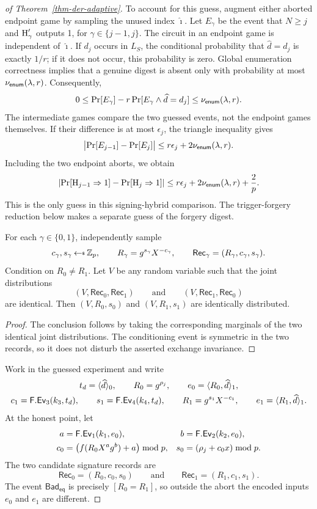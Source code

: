\begin{proof}[of Theorem~\ref{thm-der-adaptive}]
To account for this guess, augment either aborted endpoint game by sampling the unused index $\widehat\imath$. Let $E_\gamma$ be the event that $N\ge j$ and $\textnormal{H}'_\gamma$ outputs 1, for $\gamma\in\{j-1,j\}$. The circuit in an endpoint game is independent of $\widehat\imath$. If $d_j$ occurs in $L_S$, the conditional probability that $\widehat d=d_j$ is exactly $1/r$; if it does not occur, this probability is zero. Global enumeration correctness implies that a genuine digest is absent only with probability at most $\nu_{\mathsf{enum}}(\lambda,r)$. Consequently,
$$
0\le
\Pr[E_\gamma]-r\Pr[E_\gamma\land \widehat d=d_j]
\le \nu_{\mathsf{enum}}(\lambda,r).
$$
The intermediate games compare the two guessed events, not the endpoint games themselves. If their difference is at most $\epsilon_j$, the triangle inequality gives
$$
\bigl|\Pr[E_{j-1}]-\Pr[E_j]\bigr|
\le r\epsilon_j+2\nu_{\mathsf{enum}}(\lambda,r).
$$
Including the two endpoint aborts, we obtain
$$
\left|\Pr[\textnormal{H}_{j-1}\Rightarrow1]-\Pr[\textnormal{H}_j\Rightarrow1]\right|
\le r\epsilon_j+2\nu_{\mathsf{enum}}(\lambda,r)+\frac2p.
$$
This is the only guess in this signing-hybrid comparison. The trigger-forgery reduction below makes a separate guess of the forgery digest.

\begin{lemma} \label{lem-swap}
For each $\gamma\in\{0,1\}$, independently sample
$$
c_\gamma,s_\gamma\getsr\Zp,
\qquad
R_\gamma=g^{s_\gamma}X^{-c_\gamma},
\qquad
\mathsf{Rec}_\gamma=(R_\gamma,c_\gamma,s_\gamma).
$$
Condition on $R_0\ne R_1$. Let $V$ be any random variable such that the joint distributions
$$
(V,\mathsf{Rec}_0,\mathsf{Rec}_1)
\qquad\text{and}\qquad
(V,\mathsf{Rec}_1,\mathsf{Rec}_0)
$$
are identical. Then $(V,R_0,s_0)$ and $(V,R_1,s_1)$ are identically distributed.
\end{lemma}

\begin{proof}
The conclusion follows by taking the corresponding marginals of the two identical joint distributions. The conditioning event is symmetric in the two records, so it does not disturb the asserted exchange invariance.
\end{proof}

 Work in the guessed experiment and write
$$
\begin{gathered}
t_d=\langle \widehat d \rangle_0,
\qquad R_0=g^{\rho_j},
\qquad e_0=\langle R_0,\widehat d \rangle_1,\\
c_1=\mathsf{F}.\mathsf{Ev}_3(k_3,t_d),
\qquad s_1=\mathsf{F}.\mathsf{Ev}_4(k_4,t_d),
\qquad R_1=g^{s_1}X^{-c_1},
\qquad e_1=\langle R_1,\widehat d \rangle_1.
\end{gathered}
$$
At the honest point, let
$$
\begin{aligned}
a&=\mathsf{F}.\mathsf{Ev}_1(k_1,e_0),
&b&=\mathsf{F}.\mathsf{Ev}_2(k_2,e_0),\\
c_0&=\bigl(f(R_0X^ag^b)+a\bigr)\bmod p,
&s_0&=(\rho_j+c_0x)\bmod p.
\end{aligned}
$$
The two candidate signature records are
$$
\mathsf{Rec}_0=(R_0,c_0,s_0)
\qquad\text{and}\qquad
\mathsf{Rec}_1=(R_1,c_1,s_1).
$$
The event $\mathsf{Bad}_{\mathsf{eq}}$ is precisely $[R_0=R_1]$, so outside the abort the encoded inputs $e_0$ and $e_1$ are different.


\end{proof}
